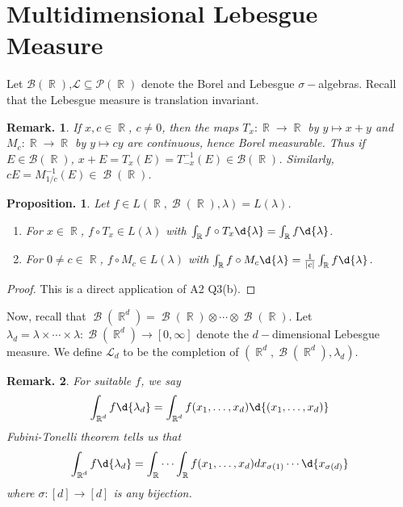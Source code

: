 \documentclass[11pt, a4paper]{memoir}
\DeclareMathOperator{\R}{{\mathbb{R}}}
\theoremstyle{change}
\newtheorem{proposition}[theorem]{Proposition.}
\theoremstyle{plain}
\theoremstyle{nonumberplain}
\newtheorem{remark}{Remark.}
\newtheorem{proof}{Proof}
\DeclareMathOperator{\B}{{\mathcal{B}}}
\begin{document}
\section{Multidimensional Lebesgue Measure}
Let $\mathcal{B}(\R)$,$\mathcal{L}\subseteq\mathcal{P}(\R)$ denote the Borel and Lebesgue $\sigma-$algebras.
Recall that the Lebesgue measure is translation invariant.
\begin{remark}
    If $x,c\in\R$, $c\neq 0$, then the maps $T_x:\R\to\R$ by $y\mapsto x+y$ and $M_c:\R\to\R$ by $y\mapsto cy$ are continuous, hence Borel measurable.
    Thus if $E\in\mathcal{B}(\R)$, $x+E=T_x(E)=T_{-x}^{-1}(E)\in\mathcal{B}(\R)$.
    Similarly, $cE=M_{1/c}^{-1}(E)\in\B(\R)$.
\end{remark}
\begin{proposition}
    Let $f\in L(\R,\B(\R),\lambda)=L(\lambda)$.
    \begin{enumerate}[nolistsep,label=(\roman*)]
        \item For $x\in\R$, $f\circ T_x\in L(\lambda)$ with $\int_{\R}f\circ T_x\d{\lambda}=\int_{\R}f\d{\lambda}$.
        \item For $0\neq c\in\R$, $f\circ M_c\in L(\lambda)$ with $\int_{\R}f\circ M_c\d{\lambda}=\frac{1}{|c|}\int_{\R}f\d{\lambda}$.
    \end{enumerate}
\end{proposition}
\begin{proof}
    This is a direct application of A2 Q3(b).
\end{proof}
Now, recall that $\B(\R^d)=\B(\R)\otimes\cdots\otimes\B(\R)$.
Let $\lambda_d=\lambda\times\cdots\times\lambda:\B(\R^d)\to[0,\infty]$ denote the $d-$dimensional Lebesgue measure.
We define $\mathcal{L}_d$ to be the completion of $(\R^d,\B(\R^d),\lambda_d)$.
\begin{remark}
    For suitable $f$, we say
    \begin{equation*}
        \int_{\R^d}f\d{\lambda_d}=\int_{\R^d}f(x_1,\ldots,x_d)\d{(x_1,\ldots,x_d)}
    \end{equation*}
    Fubini-Tonelli theorem tells us that
    \begin{equation*}
        \int_{\R^d}f\d{\lambda_d}=\int_{\R}\cdots\int_{\R}f(x_1,\ldots,x_d)dx_{\sigma(1)}\cdots\d{x_{\sigma(d)}}
    \end{equation*}
    where $\sigma:[d]\to[d]$ is any bijection.
\end{remark}
\end{document}
